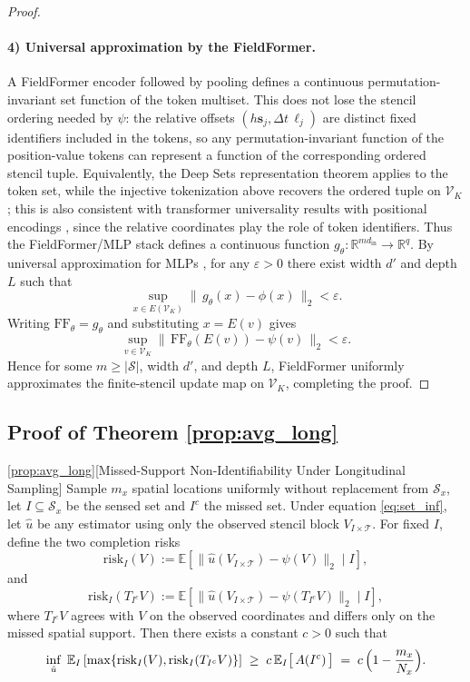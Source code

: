 \begin{proof}[Proof]
\paragraph{4) Universal approximation by the FieldFormer.}
A FieldFormer encoder followed by pooling defines a continuous
permutation-invariant set function of the token multiset. This does not lose
the stencil ordering needed by $\psi$: the relative offsets
$(h\mathbf{s}_j,\Delta t\,\ell_j)$ are distinct fixed identifiers included in
the tokens, so any permutation-invariant function of the position-value tokens
can represent a function of the corresponding ordered stencil tuple. Equivalently,
the Deep Sets representation theorem \citep{zaheer2017deep} applies to the
token set, while the injective tokenization above recovers the ordered tuple on
$\mathcal{V}_K$; this is also consistent with transformer universality results
with positional encodings \citep{yun2019transformers}, since the relative
coordinates play the role of token identifiers.
Thus the FieldFormer/MLP stack defines a continuous function
$g_\theta:\mathbb{R}^{m d_{\mathrm{in}}}\to\mathbb{R}^{q}$.
By universal approximation for MLPs \citep{hornik1991approximation},
for any $\varepsilon>0$ there exist width $d'$ and depth $L$ such that
\[
\sup_{x\in E(\mathcal{V}_K)}
\|\,g_\theta(x) - \phi(x)\,\|_2 < \varepsilon.
\]
Writing $\mathrm{FF}_{\theta}=g_\theta$ and substituting $x=E(v)$ gives
\[
\sup_{v\in\mathcal{V}_K}
\|\,\mathrm{FF}_{\theta}(E(v)) - \psi(v)\,\|_2
< \varepsilon.
\]
Hence for some $m\ge|\mathcal{S}|$, width $d'$, and depth $L$,
FieldFormer uniformly approximates the finite-stencil update map on $\mathcal{V}_K$, completing the proof.
\end{proof}

\subsection{Proof of Theorem \ref{prop:avg_long}}
\begin{restatedtheorem}{\ref{prop:avg_long}}[Missed-Support Non-Identifiability Under Longitudinal Sampling]
Sample $m_x$ spatial locations uniformly without replacement from $\mathcal{S}_x$, let $I\subseteq\mathcal{S}_x$ be the sensed set and $I^c$ the missed set.
Under equation \eqref{eq:set_inf}, let $\hat u$ be any estimator using only the observed stencil block $V_{I\times\mathcal{T}}$. For fixed $I$, define the two completion risks
\[
\mathrm{risk}_I(V)
:=
\mathbb{E}\!\left[
\|\hat u(V_{I\times\mathcal{T}})-\psi(V)\|_2
\mid I
\right],
\]
and
\[
\mathrm{risk}_I(T_{I^c}V)
:=
\mathbb{E}\!\left[
\|\hat u(V_{I\times\mathcal{T}})-\psi(T_{I^c}V)\|_2
\mid I
\right],
\]
where $T_{I^c}V$ agrees with $V$ on the observed coordinates and differs only on the missed spatial support. Then there exists a constant $c>0$ such that
\[
\inf_{\hat u}\;
\mathbb{E}_I
\left[
\max\{\mathrm{risk}_I(V),\mathrm{risk}_I(T_{I^c}V)\}
\right]
\;\ge\;
c\,\mathbb{E}_I\bigl[\,A(I^c)\,\bigr]
\;=\;
c\,\Bigl(1-\frac{m_x}{N_x}\Bigr).
\]
\end{restatedtheorem}

